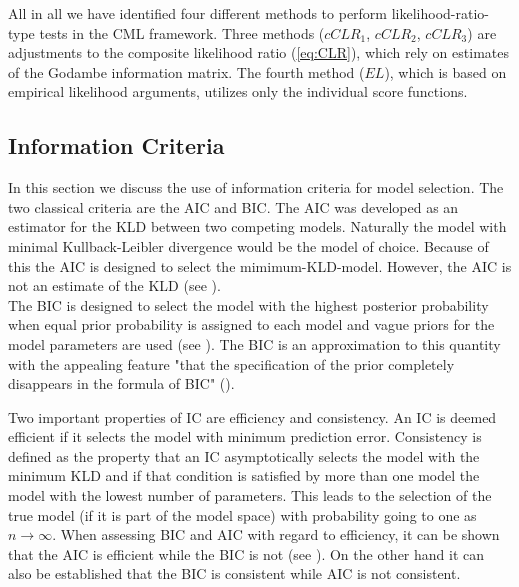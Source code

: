 \documentclass[12pt, a4paper]{article}
\numberwithin{defcounter}{section}
\numberwithin{excounter}{section}
\begin{document}
All in all we have identified four different methods to perform likelihood-ratio-type tests in the \ac{CML} framework. Three methods ($cCLR_1$, $cCLR_2$, $cCLR_3$) are adjustments to the composite likelihood ratio (\ref{eq:CLR}), which rely on estimates of the Godambe information matrix. The fourth method  ($EL$), which is based on empirical likelihood arguments, utilizes only the individual score functions.


\subsection{Information Criteria}


In this section we discuss the use of information criteria for model selection. The two classical criteria are the \ac{AIC} and \ac{BIC}. The \ac{AIC} was developed as an estimator for the \ac{KLD} between two competing models. Naturally the model with minimal Kullback-Leibler divergence would be the model of choice. Because of this the AIC is designed to select the mimimum-\ac{KLD}-model. However, the \ac{AIC} is not an estimate of the \ac{KLD} (see \citet[p. 28ff]{claeskens2008}). 
\\
The \ac{BIC} is designed to select the model with the highest posterior probability when equal prior probability is assigned to each model and vague priors for the model parameters are used (see \citet[p. 286]{burnham2002}). The BIC is an approximation to this quantity with the appealing feature "that the specification of the prior completely disappears in the formula of BIC" (\citet[p. 81]{claeskens2008}).

Two important properties of \ac{IC} are efficiency and consistency. An \ac{IC} is deemed efficient if it selects the model with minimum prediction error. Consistency is defined as the property that an \ac{IC} asymptotically selects the model with the minimum \ac{KLD} and if that condition is satisfied by more than one model the model with the lowest number of parameters. This leads to the selection of the true model (if it is part of the model space) with probability going to one as $n \to \infty$. When assessing BIC and AIC with regard to efficiency, it can be shown that the AIC is efficient while the BIC is not (see \citet[p. 112]{claeskens2008}). On the other hand it can also be established that the BIC is consistent while AIC is not consistent.
\end{document}
